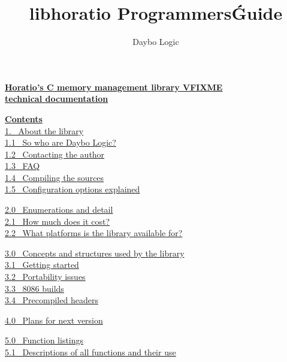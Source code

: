 \documentclass{article}
\begin{document}
\title{libhoratio Programmers\' Guide}\author{Daybo Logic}
\maketitle

\par\vspace*{\fill}
\begin{center}

\end{center}

\newpage
\textbf{\underline{Horatio's C memory management library
VFIXME}}
\\
\textbf{\underline{technical documentation}}
\par \textbf{\underline{Contents}}
\\
\href{#About}{1.~ About the library}
\\
\href{#Who}{1.1~ So who are Daybo Logic?}
\\
\href{#Contact}{1.2~ Contacting the author}
\\
\href{#FAQ}{1.3~ FAQ}
\\
\href{#Compile}{1.4~ Compiling the sources}
\\
\href{#Config}{1.5~ Configuration options explained}

\par \href{#Enumerations}{2.0~ Enumerations and detail}\\
\href{#Cost}{2.1~ How much does it cost?}
\\
\href{#Platforms}{2.2~ What platforms is the library available
for?}

\par \href{#Concepts}{3.0~ Concepts and structures used by the
library}
\\
\href{#Starting}{3.1~ Getting started}
\\
\href{#Portability}{3.2~ Portability issues}
\\
\href{#8086}{3.3~ 8086 builds}
\\
\href{#PCH}{3.4~ Precompiled headers}

\href{#Plans}{4.0~ Plans for next version}

\par \href{#Listings}{5.0~ Function listings}\\
\href{#FuncDescs}{5.1~ Descriptions of all functions and their use}
\end{document}
